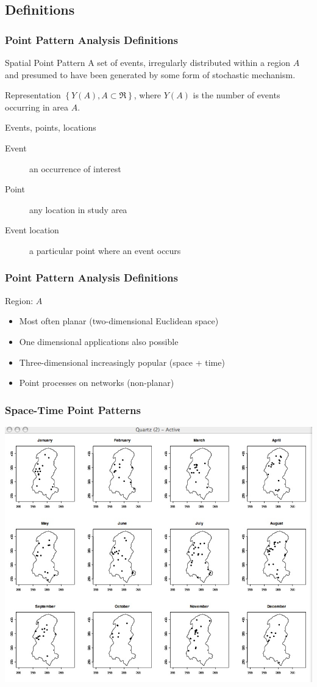 \documentclass[nototal]{beamer}
\begin{document}
\subsection{Definitions}
\begin{frame}[<+->]
  \frametitle{Point Pattern Analysis Definitions}
  \begin{block}{Spatial Point Pattern}
    A set of events, irregularly distributed within a region $A$ and presumed
    to have been generated by some form of stochastic mechanism. 
   \end{block}
   \begin{block}{Representation}
$\left\{Y(A),
    A \subset \Re \right\}$, where $Y(A)$ is the number of events occurring in
    area $A$.
   \end{block}
   \begin{block}{Events, points, locations}
     \begin{description}
       \item[Event] an occurrence of interest
       \item[Point] any location in study area
       \item[Event location] a particular point where an event occurs
     \end{description}
\end{block}
\end{frame}

\begin{frame}[<+->]
  \frametitle{Point Pattern Analysis Definitions}
\begin{block}{Region: $A$}
    \begin{itemize}
      \item Most often planar (two-dimensional Euclidean space)
      \item One dimensional applications also possible
      \item Three-dimensional increasingly popular (space + time)
      \item Point processes on networks (non-planar)
    \end{itemize}
   \end{block}
 \end{frame}


\begin{frame}[<+->]
  \frametitle{Space-Time Point Patterns}
    \begin{center}
      \includegraphics[width=0.65\linewidth]{tspoints}
    \end{center}
  \end{frame}
\end{document}
